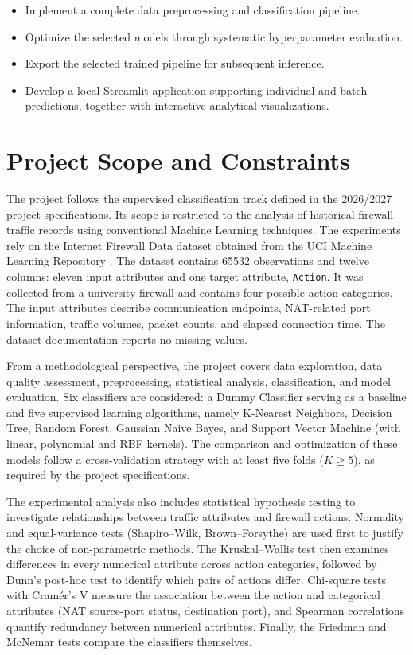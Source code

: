\begin{itemize}
    \item Implement a complete data preprocessing and classification pipeline.
    \item Optimize the selected models through systematic hyperparameter evaluation.
    \item Export the selected trained pipeline for subsequent inference.
    \item Develop a local Streamlit application supporting individual and batch predictions, together with interactive analytical visualizations.
\end{itemize}

\section{Project Scope and Constraints}

The project follows the supervised classification track defined in the 2026/2027 project specifications. Its scope is restricted to the analysis of historical firewall traffic records using conventional Machine Learning techniques. The experiments rely on the Internet Firewall Data dataset obtained from the UCI Machine Learning Repository \cite{uciFirewallData}. The dataset contains \num{65532} observations and twelve columns: eleven input attributes and one target attribute, \texttt{Action}. It was collected from a university firewall and contains four possible action categories. The input attributes describe communication endpoints, NAT-related port information, traffic volumes, packet counts, and elapsed connection time. The dataset documentation reports no missing values.

From a methodological perspective, the project covers data exploration, data quality assessment, preprocessing, statistical analysis, classification, and model evaluation. Six classifiers are considered: a Dummy Classifier serving as a baseline and five supervised learning algorithms, namely K-Nearest Neighbors, Decision Tree, Random Forest, Gaussian Naive Bayes, and Support Vector Machine (with linear, polynomial and RBF kernels). The comparison and optimization of these models follow a cross-validation strategy with at least five folds ($K \geq 5$), as required by the project specifications.

The experimental analysis also includes statistical hypothesis testing to investigate relationships between traffic attributes and firewall actions. Normality and equal-variance tests (Shapiro--Wilk, Brown--Forsythe) are used first to justify the choice of non-parametric methods. The Kruskal--Wallis test then examines differences in every numerical attribute across action categories, followed by Dunn's post-hoc test to identify which pairs of actions differ. Chi-square tests with Cram\'er's V measure the association between the action and categorical attributes (NAT source-port status, destination port), and Spearman correlations quantify redundancy between numerical attributes. Finally, the Friedman and McNemar tests compare the classifiers themselves.

